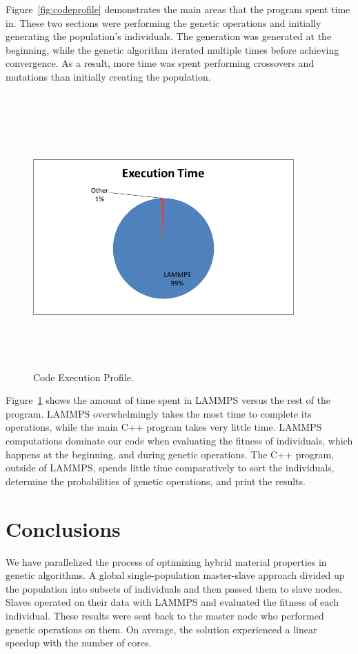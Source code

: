 \documentclass[letterpaper, 12pt]{article}
\begin{document}
\begin{flushleft}
Figure~\ref{fig:codeprofile} demonstrates the main areas that the program spent time in.  These two sections were performing the genetic operations and initially generating the population's individuals.  The generation was generated at the beginning, while the genetic algorithm iterated multiple times before achieving convergence.  As a result, more time was spent performing crossovers and mutations than initially creating the population. \\

~\newline
\begin{figure}[H]
	\centering
	\includegraphics[width=10cm,height=10cm,keepaspectratio]{execution.png}
	\caption[Execution]{Code Execution Profile.}
	\label{fig:execprofile}
\end{figure}

Figure~\ref{fig:execprofile} shows the amount of time spent in LAMMPS versus the rest of the program.  LAMMPS overwhelmingly takes the most time to complete its operations, while the main C++ program takes very little time.  LAMMPS computations dominate our code when evaluating the fitness of individuals, which happens at the beginning, and during genetic operations.  The C++ program, outside of LAMMPS, spends little time comparatively to sort the individuals, determine the probabilities of genetic operations, and print the results. \\

\newpage
\section*{Conclusions}
We have parallelized the process of optimizing hybrid material properties in genetic algorithms.  A global single-population master-slave approach  divided up the population into subsets of individuals and then passed them to slave nodes.  Slaves operated on their data with LAMMPS and evaluated the fitness of each individual.  These results were sent back to the master node who performed genetic operations on them.  On average, the solution experienced a linear speedup with the number of cores.


\end{flushleft}
\end{document}
